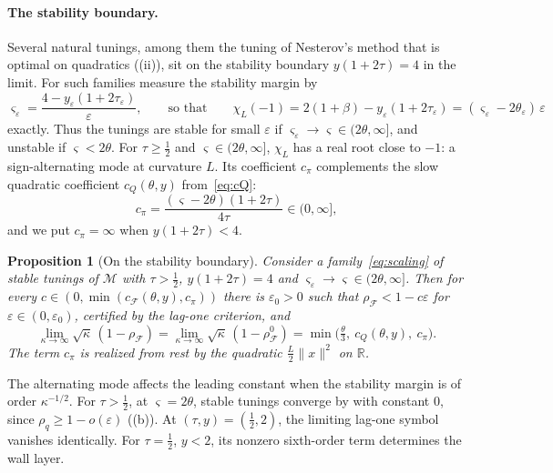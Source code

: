 \documentclass[11pt]{article}
\newtheorem{proposition}[theorem]{Proposition}
\theoremstyle{definition}
\theoremstyle{remark}
\newcommand{\R}{\mathbb R}
\newcommand{\cF}{\mathcal F}
\newcommand{\cM}{\mathcal M}
\newcommand{\norm}[1]{\lVert #1\rVert}
\newcommand{\rhoF}{\rho_{\cF}}
\newcommand{\rhoz}{\rho_{\cF}^{0}}
\newcommand{\cQ}{c_{Q}}
\newcommand{\cFF}{c_{\cF}}
\newcommand{\cpi}{c_{\pi}}
\begin{document}
\paragraph{The stability boundary.}
Several natural tunings, among them the tuning of
Nesterov's method that is optimal on quadratics ((ii)), sit on the stability boundary
\(y(1+2\tau)=4\) in the limit.  For such families measure the stability margin by
\begin{equation}\label{eq:margin}
\varsigma_\varepsilon=\frac{4-y_\varepsilon(1+2\tau_\varepsilon)}{\varepsilon},\qquad\text{so that}\qquad
\chi_L(-1)=2(1+\beta)-y_\varepsilon(1+2\tau_\varepsilon)=(\varsigma_\varepsilon-2\theta_\varepsilon)\,\varepsilon
\end{equation}
exactly.  Thus the tunings are stable for small \(\varepsilon\) if \(\varsigma_\varepsilon\to\varsigma\in(2\theta,\infty]\), and
unstable if \(\varsigma<2\theta\).  For \(\tau\ge\frac12\) and \(\varsigma\in(2\theta,\infty]\), \(\chi_L\) has a real root close to \(-1\): a
sign-alternating mode at curvature \(L\).  Its coefficient \(\cpi\) complements
the slow quadratic coefficient \(\cQ(\theta,y)\) from~\eqref{eq:cQ}:
\begin{equation}\label{eq:cpi}
\cpi=\frac{(\varsigma-2\theta)(1+2\tau)}{4\tau}\in(0,\infty],
\end{equation}
and we put \(\cpi=\infty\) when \(y(1+2\tau)<4\).

\begin{proposition}[On the stability boundary]\label{prop:boundary}
Consider a family~\eqref{eq:scaling} of stable tunings of \(\cM\) with \(\tau>\frac12\), \(y(1+2\tau)=4\) and
\(\varsigma_\varepsilon\to\varsigma\in(2\theta,\infty]\).  Then for every \(c\in(0,\min(\cFF(\theta,y),\cpi))\) there is
\(\varepsilon_0>0\) such that \(\rhoF<1-c\varepsilon\) for \(\varepsilon\in(0,\varepsilon_0)\), certified by the lag-one criterion, and
\[
\lim_{\kappa\to\infty}\sqrt\kappa\,(1-\rhoF)=\lim_{\kappa\to\infty}\sqrt\kappa\,(1-\rhoz)=\min\bigl(\tfrac\theta3,\ \cQ(\theta,y),\ \cpi\bigr).
\]
The term \(\cpi\) is realized from rest by the quadratic \(\frac L2\norm x^2\) on \(\R\).
\end{proposition}

The alternating mode affects the leading constant when the stability margin is of order
\(\kappa^{-1/2}\).  For \(\tau>\frac12\), at \(\varsigma=2\theta\), stable tunings converge by 
with constant \(0\), since \(\rho_q\ge1-o(\varepsilon)\) ((b)).
At \((\tau,y)=(\tfrac12,2)\), the limiting lag-one symbol vanishes identically.
For \(\tau=\tfrac12\), \(y<2\), its nonzero sixth-order term determines the wall layer.
\end{document}
